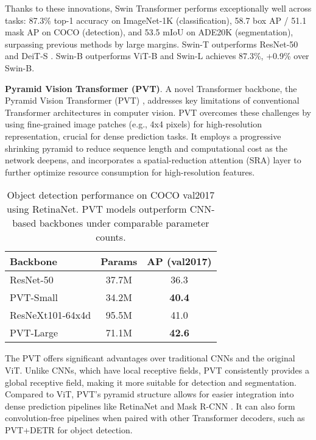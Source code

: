 \documentclass[conference]{IEEEtran}
\begin{document}
Thanks to these innovations, Swin Transformer performs exceptionally well across tasks: 87.3\% top-1 accuracy on ImageNet-1K \cite{deng2009imagenet} (classification), 58.7 box AP / 51.1 mask AP on COCO \cite{lin2014microsoft} (detection), and 53.5 mIoU on ADE20K (segmentation), surpassing previous methods by large margins. Swin-T outperforms ResNet-50 \cite{qiao2020detectors} and DeiT-S \cite{touvron2021training }. Swin-B outperforms ViT-B \cite{dosovitskiy2021an} and Swin-L achieves 87.3\%, +0.9\% over Swin-B.


\vspace{1em}

\textbf{Pyramid Vision Transformer (PVT)}.
\hspace{0.5em}A novel Transformer backbone, the Pyramid Vision Transformer (PVT) \cite{wang2021pyramidvisiontransformerversatile}, addresses key limitations of conventional Transformer architectures in computer vision. PVT overcomes these challenges by using fine-grained image patches (e.g., 4x4 pixels) for high-resolution representation, crucial for dense prediction tasks. It employs a progressive shrinking pyramid to reduce sequence length and computational cost as the network deepens, and incorporates a spatial-reduction attention (SRA) layer to further optimize resource consumption for high-resolution features.


\begin{table}[ht]
\caption{Object detection performance on COCO val2017 using RetinaNet. PVT models outperform CNN-based backbones under comparable parameter counts.}
\label{tab:pvt_retinanet}
\centering
\begin{tabular}{lcc}
\toprule
\textbf{Backbone} & \textbf{Params} & \textbf{AP (val2017)} \\
\midrule
ResNet-50 \cite{He2016deep} & 37.7M & 36.3 \\
PVT-Small \cite{wang2021pyramidvisiontransformerversatile} & 34.2M & \textbf{40.4} \\
ResNeXt101-64x4d \cite{xie2017aggregatedresidualtransformationsdeep} & 95.5M & 41.0 \\
PVT-Large \cite{wang2021pyramidvisiontransformerversatile} & 71.1M & \textbf{42.6} \\
\bottomrule
\end{tabular}
\end{table}


The PVT offers significant advantages over traditional CNNs and the original ViT. Unlike CNNs, which have local receptive fields, PVT consistently provides a global receptive field, making it more suitable for detection and segmentation. Compared to ViT, PVT's pyramid structure allows for easier integration into dense prediction pipelines like RetinaNet \cite{Lin2017focal} and Mask R-CNN \cite{He2017mask}. It can also form convolution-free pipelines when paired with other Transformer decoders, such as PVT+DETR \cite{Carion2020endtoend} for object detection.
\end{document}
